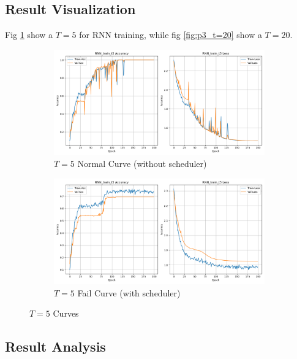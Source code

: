 \documentclass{article}
\begin{document}
\subsection{Result Visualization}

Fig \ref{fig:p3_t=5} show a $T=5$ for RNN training, while fig \ref{fig:p3_t=20} show a $T=20$.

\begin{figure}[!htbp]
  \centering
  \begin{subfigure}[b]{1\textwidth}
    \includegraphics[width=\textwidth]{img/Part3/RNN_train_t5.png}
    \caption{$T=5$ Normal Curve (without scheduler)}
  \end{subfigure}
  \begin{subfigure}[b]{1\textwidth}
    \includegraphics[width=\textwidth]{img/Part3/RNN_train_t5_fail.png}
    \caption{$T=5$ Fail Curve (with scheduler)}
  \end{subfigure}
  \caption{$T=5$ Curves}
  \label{fig:p3_t=5}
\end{figure}

\subsection{Result Analysis}
\end{document}
